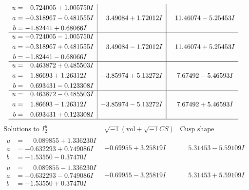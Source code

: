 \documentclass[1p]{elsarticle_modified}
\theoremstyle{definition}
\newcommand{\I}{\sqrt{-1}}
\begin{document}
$$\begin{array}{c|c|c}
\begin{aligned}
u &= -0.724005 + 1.005750 I \\
a &= -0.318967 - 0.481555 I \\
b &= -1.82441 + 0.68066 I\end{aligned}
 & \phantom{-}3.49084 + 1.72012 I & \phantom{-}11.46074 - 5.25453 I \\ \hline\begin{aligned}
u &= -0.724005 - 1.005750 I \\
a &= -0.318967 + 0.481555 I \\
b &= -1.82441 - 0.68066 I\end{aligned}
 & \phantom{-}3.49084 - 1.72012 I & \phantom{-}11.46074 + 5.25453 I \\ \hline\begin{aligned}
u &= \phantom{-}0.463872 + 0.485503 I \\
a &= \phantom{-}1.86693 + 1.26312 I \\
b &= \phantom{-}0.693431 - 0.123308 I\end{aligned}
 & -3.85974 + 5.13272 I & \phantom{-}7.67492 - 5.46593 I \\ \hline\begin{aligned}
u &= \phantom{-}0.463872 - 0.485503 I \\
a &= \phantom{-}1.86693 - 1.26312 I \\
b &= \phantom{-}0.693431 + 0.123308 I\end{aligned}
 & -3.85974 - 5.13272 I & \phantom{-}7.67492 + 5.46593 I\\
 \hline 
 \end{array}$$\newpage$$\begin{array}{c|c|c}  
\text{Solutions to }I^u_{2}& \I (\text{vol} + \sqrt{-1}CS) & \text{Cusp shape}\\
 \hline 
\begin{aligned}
u &= \phantom{-}0.089855 + 1.336230 I \\
a &= -0.632293 + 0.749086 I \\
b &= -1.53550 - 0.37470 I\end{aligned}
 & -0.69955 + 3.25819 I & \phantom{-}5.31453 - 5.59109 I \\ \hline\begin{aligned}
u &= \phantom{-}0.089855 - 1.336230 I \\
a &= -0.632293 - 0.749086 I \\
b &= -1.53550 + 0.37470 I\end{aligned}
 & -0.69955 - 3.25819 I & \phantom{-}5.31453 + 5.59109 I \\ \hline\begin{aligned}

\end{aligned}
\end{array}$$
\end{document}
